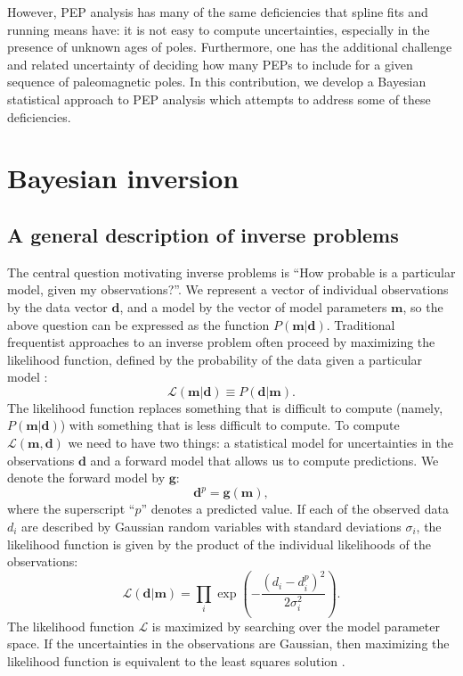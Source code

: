 \documentclass[11pt,letterpaper]{article}
\begin{document}
However, PEP analysis has many of the same deficiencies that spline fits and running means have: it is not easy to compute uncertainties, especially in the presence of unknown ages of poles. Furthermore, one has the additional challenge and related uncertainty of deciding how many PEPs to include for a given sequence of paleomagnetic poles. In this contribution, we develop a Bayesian statistical approach to PEP analysis which attempts to address some of these deficiencies.

\section*{Bayesian inversion}
\subsection*{A general description of inverse problems}

The central question motivating inverse problems is ``How probable is a particular model, given my observations?''. We represent a vector of individual observations by the data vector $\mathbf{d}$, and a model by the vector of model parameters $\mathbf{m}$, so the above question can be expressed as the function $P(\mathbf{m} \vert \mathbf{d})$. Traditional frequentist approaches to an inverse problem often proceed by maximizing the likelihood function, defined by the probability of the data given a particular model \citep[e.g][]{Aster2005a}:
\begin{equation}
\mathcal{L} ( \mathbf{m} \vert \mathbf{d} ) \equiv P( \mathbf{d} \vert \mathbf{m} ).
\label{eq:likelihood}
\end{equation}
The likelihood function replaces something that is difficult to compute (namely, $P(\mathbf{m} \vert \mathbf{d})$)
with something that is less difficult to compute. 
To compute $\mathcal{L}(\mathbf{m}, \mathbf{d})$ we need to have two things: a statistical model for 
uncertainties in the observations $\mathbf{d}$ and a forward model that allows us to compute
predictions. We denote the forward model by $\mathbf{g}$:
\begin{equation}
\mathbf{d}^p = \mathbf{g}(\mathbf{m}),
\label{eq:forward}
\end{equation}
where the superscript ``$p$'' denotes a predicted value.
If each of the observed data $d_i$ are described by Gaussian random variables with standard deviations $\sigma_i$, the likelihood function is given by the product of the individual likelihoods of the observations:
\begin{equation}
\mathcal{L}(\mathbf{d} | \mathbf{m} ) = \displaystyle\prod_i \exp\left({-\frac{(d_i - d_{i}^p)^2}{2 \sigma_i^2}}\right).
\label{eq:example_likelihood}
\end{equation}
The likelihood function $\mathcal{L}$ is maximized by searching over the model parameter space.
If the uncertainties in the observations are Gaussian, then maximizing the likelihood function is
equivalent to the least squares solution \citep{Aster2005a}.
\end{document}
